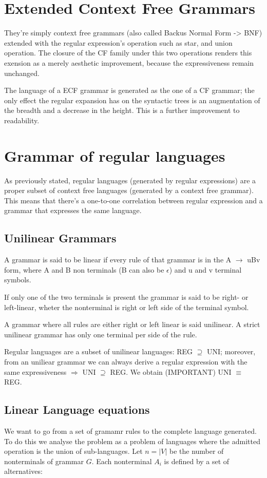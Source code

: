 	\section{Extended Context Free Grammars}
		They're simply context free grammars (also called Backus Normal Form -> BNF) extended with the regular expression's operation such as star, and union 
		operation. The closure of the CF family under this two operations renders this exension as a merely aesthetic improvement, because the expressiveness 
		remain unchanged.

		The language of a ECF grammar is generated as the one of a CF grammar; the only effect the regular expansion has on the syntactic trees is an augmentation 
		of the breadth and a decrease in the height. This is a further improvement to readability.
	
	\section{Grammar of regular languages}
		As previously stated, regular languages (generated by regular expressions) are a proper subset of context free languages (generated by a context free 
		grammar). This means that there's a one-to-one correlation between regular expression and a grammar that expresses the same language. 
		\subsection{Unilinear Grammars}
		\label{sec:uni_linear_grammars}
			A grammar is said to be linear if every rule of that grammar is in the A $\rightarrow$ uBv form, where A and B non terminals (B can also be $\epsilon$) 
			and u and v terminal symbols.

			If only one of the two terminals is present the grammar is said to be right- or left-linear, wheter the nonterminal is right or left side of the 
			terminal symbol.

			A grammar where all rules are either right or left linear is said unilinear. A strict unilinear grammar has only one terminal per side of the rule.
			\begin{property}
				Regular languages are a subset of unilinear languages: REG $\supseteq$ UNI; moreover, from an uniliear grammar we can always derive a regular 
				expression with the same expressiveness $\Rightarrow$ UNI $\supseteq$ REG. We obtain (IMPORTANT) UNI $\equiv$ REG.
			\end{property}
		\subsection{Linear Language equations}\label{sect:linlangeq}
			We want to go from a set of gramamr rules to the complete language generated. To do this we analyse the problem as a problem of languages where the 
			admitted operation is the union of sub-languages.
			Let $n = \lvert V \rvert$ be the number of nonterminals of grammar $G$. Each nonterminal $A_i$ is defined by a set of alternatives:

